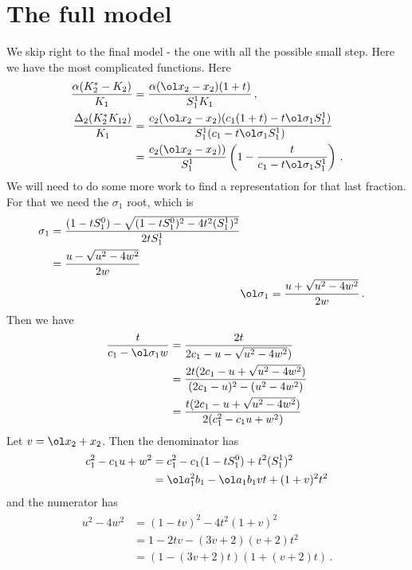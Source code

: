 \section{The full model}
We skip right to the final model - the one with all the possible small step. Here we have the most complicated functions. Here
\begin{align}
	\frac{\alpha(K_2^\ast -K_2)}{K_1}  &= \frac{\alpha (\ol x_2 - x_2)(1+t)}{S_1^1K_1}\,,\\
	\frac{\Delta_2(K_2^\ast K_{12})}{K_1} &= \frac{c_2(\ol x_2-x_2)(c_1(1+t)- t \ol \sigma_1S_1^1)}{S_1^1(c_1-t\ol \sigma_1S_1^1)}\\
	&=\frac{c_2(\ol x_2-x_2))}{S_1^1}\left(1-\frac{t}{c_1-t\ol \sigma_1S_1^1}\right)\,.
\end{align}
We will need to do some more work to find a representation for that last fraction. For that we need the $\sigma_1$ root, which is
\begin{align}
\begin{split}
	\sigma_1 &= \frac{(1-tS_1^0)-\sqrt{(1-tS_1^0)^2-4t^2(S_1^1)^2}}{2tS_1^1} \\
		&= \frac{u-\sqrt{u^2-4w^2}}{2w}\\
\end{split}\\
	&\ol \sigma_1 = \frac{u+\sqrt{u^2-4w^2}}{2w}\,.
\end{align}
Then we have
\begin{align}
\begin{split}
	\frac{t}{c_1-\ol \sigma_1w} &= \frac{2t}{2c_1-u-\sqrt{u^2-4w^2})} \\
	&= \frac{2t(2c_1-u+\sqrt{u^2-4w^2})}{(2c_1-u)^2-(u^2-4w^2)}\\
	&=  \frac{t(2c_1-u+\sqrt{u^2-4w^2})}{2(c_1^2-c_1u+w^2)}
\end{split}
\end{align}
Let $v = \ol x_2+x_2$. Then the denominator has
\begin{align}
\begin{split}
	c_1^2-c_1u+w^2 &= c_1^2-c_1(1-tS_1^0)+t^2(S_1^1)^2\\&=\ol a_1^2b_1 - \ol a_1b_1vt+(1+v)^2 t^2
\end{split}
\end{align}
and the numerator has
\begin{align}
\begin{split}
	u^2-4w^2 &= (1-tv)^2-4t^2(1+v)^2 \\&= 1-2tv-(3v+2)(v+2)t^2 \\&= (1-(3v+2)t)(1+(v+2)t)\,.
\end{split}
\end{align}
